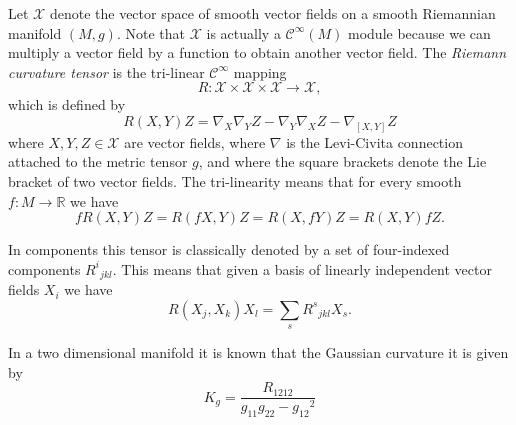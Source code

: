 \documentclass[12pt]{article}
\begin{document}
Let 
$\mathcal{X}$ denote the vector space of smooth vector fields on a
smooth Riemannian manifold $(M,g)$.  Note that $\mathcal{X}$ is actually a
$\mathcal{C}^\infty(M)$ module because we can multiply a vector field
by a function to obtain another vector field.
The \emph{Riemann curvature tensor} is the tri-linear
$\mathcal{C}^\infty$ mapping  
$$R:{\mathcal{X}}\times{\mathcal{X}}\times{\mathcal{X}}\to{\mathcal{X}},$$ 
which is defined by
$$R(X,Y)Z=\nabla_X\nabla_YZ-\nabla_Y\nabla_XZ-\nabla_{[X,Y]}Z$$
where $X,Y,Z\in\mathcal{X}$ are vector fields,  where $\nabla$ is
the Levi-Civita connection attached to the metric tensor $g$, and
where the square brackets denote the Lie bracket of two vector fields.
The tri-linearity means that for every smooth $f\colon M\to\mathbb{R}$
we have
$$fR(X,Y)Z=R(fX,Y)Z=R(X,fY)Z=R(X,Y)fZ.$$

In components this tensor is classically denoted by a set of
four-indexed components ${R^i}_{jkl}$. This means that given a
basis of linearly independent vector fields $X_i$ we have
$$R(X_j,X_k)X_l=\sum_s {R^s}_{jkl}X_s.$$

In a two dimensional manifold it is known that the Gaussian curvature
it is given by
$$K_g=\frac{R_{1212}}{g_{11}g_{22}-{g_{12}}^2}$$
\end{document}
